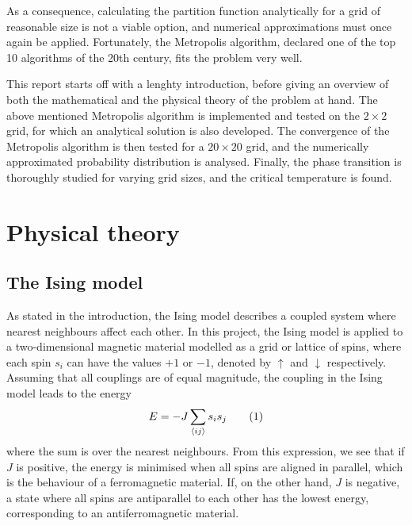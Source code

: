 \documentclass[12pt,english,a4paper]{article}
\newcommand{\eqtag}[1]{\refstepcounter{equation}\tag{\theequation}\label{#1}}
\begin{document}
As a consequence, calculating the partition function analytically for a grid of reasonable size is not a viable option, and numerical approximations must once again be applied. Fortunately, the Metropolis algorithm, declared one of the top 10 algorithms of the 20th century\autocite{top10algo}, fits the problem very well.

This report starts off with a lenghty introduction, before giving an overview of both the mathematical and the physical theory of the problem at hand. The above mentioned Metropolis algorithm is implemented and tested on the \(2\times2\) grid, for which an analytical solution is also developed. The convergence of the Metropolis algorithm is then tested for a \(20\times20\) grid, and the numerically approximated probability distribution is analysed. Finally, the phase transition is thoroughly studied for varying grid sizes, and the critical temperature is found.

\clearpage
\section{Physical theory}
\subsection{The Ising model}
As stated in the introduction, the Ising model describes a coupled system where nearest neighbours affect each other. In this project, the Ising model is applied to a two-dimensional magnetic material modelled as a grid or lattice of spins, where each spin \(s_i\) can have the values \(+1\) or \(-1\), denoted by \(\uparrow\) and \(\downarrow\) respectively. Assuming that all couplings are of equal magnitude, the coupling in the Ising model leads to the energy
\[
E = -J\sum_{\langle ij\rangle}s_is_j\eqtag{energy}
\]
where the sum is over the nearest neighbours. From this expression, we see that if \(J\) is positive, the energy is minimised when all spins are aligned in parallel, which is the behaviour of a ferromagnetic material. If, on the other hand, \(J\) is negative, a state where all spins are antiparallel to each other has the lowest energy, corresponding to an antiferromagnetic material.
\end{document}
